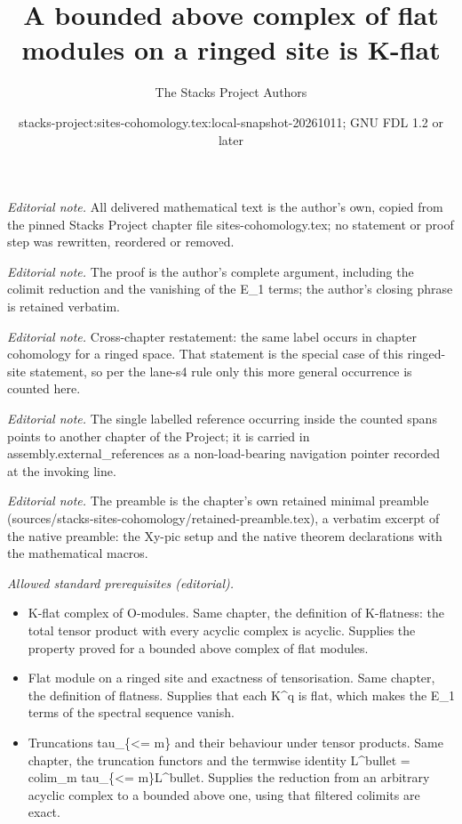 \documentclass[10pt,a4paper]{amsart}
\title{A bounded above complex of flat modules on a ringed site is K-flat}
\author{The Stacks Project Authors}
\date{stacks-project:sites-cohomology.tex:local-snapshot-20261011; GNU FDL 1.2 or later}
\theoremstyle{plain}
\theoremstyle{definition}
\theoremstyle{remark}
\numberwithin{equation}{subsection}
\begin{document}
\maketitle
\noindent\textit{Editorial note.} All delivered mathematical text is the author's own, copied from the pinned Stacks Project chapter file sites-cohomology.tex; no statement or proof step was rewritten, reordered or removed.\par\medskip
\noindent\textit{Editorial note.} The proof is the author's complete argument, including the colimit reduction and the vanishing of the E\_1 terms; the author's closing phrase is retained verbatim.\par\medskip
\noindent\textit{Editorial note.} Cross-chapter restatement: the same label occurs in chapter cohomology for a ringed space. That statement is the special case of this ringed-site statement, so per the lane-s4 rule only this more general occurrence is counted here.\par\medskip
\noindent\textit{Editorial note.} The single labelled reference occurring inside the counted spans points to another chapter of the Project; it is carried in assembly.external\_references as a non-load-bearing navigation pointer recorded at the invoking line.\par\medskip
\noindent\textit{Editorial note.} The preamble is the chapter's own retained minimal preamble (sources/stacks-sites-cohomology/retained-preamble.tex), a verbatim excerpt of the native preamble: the Xy-pic setup and the native theorem declarations with the mathematical macros.\par\medskip
\noindent\textit{Allowed standard prerequisites (editorial).}\begin{itemize}
\item K-flat complex of O-modules. Same chapter, the definition of K-flatness: the total tensor product with every acyclic complex is acyclic. Supplies the property proved for a bounded above complex of flat modules.
\item Flat module on a ringed site and exactness of tensorisation. Same chapter, the definition of flatness. Supplies that each K\textasciicircum{}q is flat, which makes the E\_1 terms of the spectral sequence vanish.
\item Truncations tau\_\{<= m\} and their behaviour under tensor products. Same chapter, the truncation functors and the termwise identity L\textasciicircum{}bullet = colim\_m tau\_\{<= m\}L\textasciicircum{}bullet. Supplies the reduction from an arbitrary acyclic complex to a bounded above one, using that filtered colimits are exact.
\end{itemize}\medskip
\end{document}
